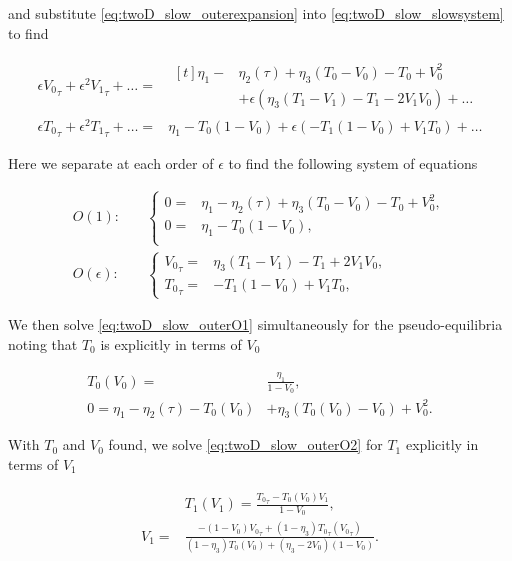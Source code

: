 and substitute \eqref{eq:twoD_slow_outerexpansion} into \eqref{eq:twoD_slow_slowsystem} to find

\begin{equation*}
\begin{aligned}
 \epsilon{V_0}_\tau+\epsilon^2{V_1}_\tau+\ldots =&\begin{aligned}[t]
\eta_1-&\eta_2(\tau)+\eta_3(T_0-V_0)-T_0+V_0^2\\
&+\epsilon(\eta_3(T_1-V_1)-T_1-2V_1V_0)+\ldots
\end{aligned}\\
\epsilon{T_0}_\tau+\epsilon^2{T_1}_\tau+\ldots=&\eta_1-T_0(1-V_0)+\epsilon(-T_1(1-V_0)+V_1T_0)+\ldots
\end{aligned}
\end{equation*}

Here we separate at each order of $\epsilon$ to find the following system of equations

\begin{align}
\label{eq:twoD_slow_outerO1}
O(1):\quad & \begin{cases}
	0 =& \eta_1-\eta_2(\tau)+\eta_3(T_0-V_0)-T_0+V_0^2 , \\
	0 =&  \eta_1-T_0(1-V_0),\\
\end{cases}\\
\label{eq:twoD_slow_outerO2}
O(\epsilon):\quad & \begin{cases}
	{V_0}_\tau = & \eta_3(T_1-V_1)-T_1+2V_1V_0,\\
	{T_0}_\tau =&  -T_1(1-V_0)+V_1T_0,
\end{cases}
\end{align}

We then solve \eqref{eq:twoD_slow_outerO1} simultaneously for the pseudo-equilibria noting that $T_0$ is explicitly in terms of $V_0$ 

\begin{equation}\label{eq:twoD_slow_equilibria}
\begin{aligned}
T_0(V_0)=&\frac{\eta_1}{1-V_0},\\
0=\eta_1-\eta_2(\tau)-T_0(V_0)&+\eta_3(T_0(V_0)-V_0)+V_0^2.
\end{aligned}
\end{equation}

With $T_0$ and $V_0$ found, we solve \eqref{eq:twoD_slow_outerO2} for $T_1$ explicitly in terms of $V_1$ 

\begin{equation}\label{eq:twoD_slow_equilcorrec}
\begin{aligned}
&T_1(V_1) = \frac{{T_0}_\tau-T_0(V_0)V_1}{1-V_0},\\
V_1 =& \frac{-(1-V_0){V_0}_\tau+(1-\eta_3){T_0}_\tau({V_0}_\tau)}{(1-\eta_3)T_0(V_0)+(\eta_3-2V_0)(1-V_0)}.
\end{aligned}
\end{equation}

